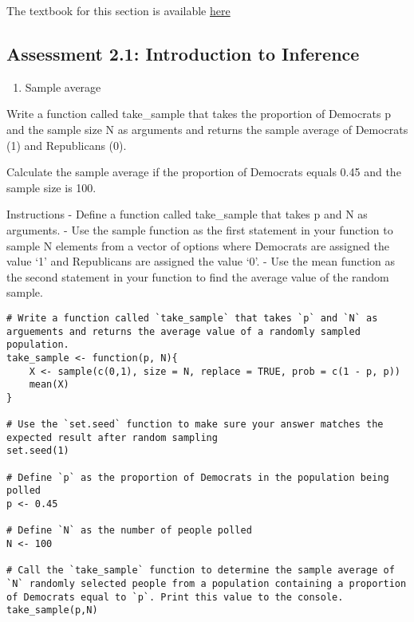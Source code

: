 \documentclass[
]{article}
\providecommand{\tightlist}{%
  \setlength{\itemsep}{0pt}\setlength{\parskip}{0pt}}
\begin{document}
The textbook for this section is available
\href{https://rafalab.github.io/dsbook/random-variables.html\#central-limit-theorem}{here}

\hypertarget{assessment-2.1-introduction-to-inference}{%
\subsection{Assessment 2.1: Introduction to
Inference}\label{assessment-2.1-introduction-to-inference}}

\begin{enumerate}
\def\labelenumi{\arabic{enumi}.}
\tightlist
\item
  Sample average
\end{enumerate}

Write a function called take\_sample that takes the proportion of
Democrats p and the sample size N as arguments and returns the sample
average of Democrats (1) and Republicans (0).

Calculate the sample average if the proportion of Democrats equals 0.45
and the sample size is 100.

Instructions - Define a function called take\_sample that takes p and N
as arguments. - Use the sample function as the first statement in your
function to sample N elements from a vector of options where Democrats
are assigned the value `1' and Republicans are assigned the value `0'. -
Use the mean function as the second statement in your function to find
the average value of the random sample.

\begin{verbatim}
# Write a function called `take_sample` that takes `p` and `N` as arguements and returns the average value of a randomly sampled population.
take_sample <- function(p, N){
    X <- sample(c(0,1), size = N, replace = TRUE, prob = c(1 - p, p))
    mean(X)
}

# Use the `set.seed` function to make sure your answer matches the expected result after random sampling
set.seed(1)

# Define `p` as the proportion of Democrats in the population being polled
p <- 0.45

# Define `N` as the number of people polled
N <- 100

# Call the `take_sample` function to determine the sample average of `N` randomly selected people from a population containing a proportion of Democrats equal to `p`. Print this value to the console.
take_sample(p,N)
\end{verbatim}
\end{document}
